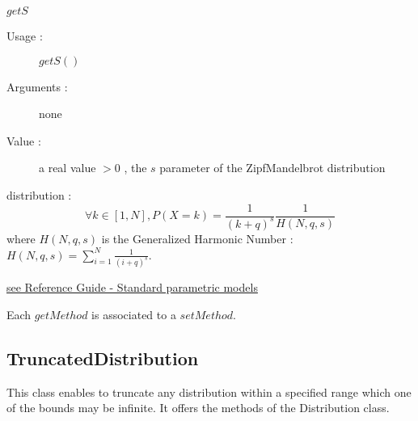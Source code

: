 \begin{description}
\begin{description}
  \item $getS$
    \begin{description}
    \item[Usage :] $getS()$
    \item[Arguments :] none
    \item[Value :]  a real value $>0$ ,  the $s$ parameter of the ZipfMandelbrot distribution
    \end{description}

  \end{description}

\item[Details :]  \rule{0pt}{1em}
  \begin{description}
  \item distribution :
    $$
    \forall k\in [1,N], P(X=k) = \frac{1}{(k+q)^s} \frac{1}{H(N,q,s)}
    $$
    where $H(N,q,s)$ is the Generalized Harmonic Number : $H(N,q,s) = \sum_{i=1}^{N} \displaystyle \frac{1}{(i+q)^s}$.

  \end{description}
  \bigskip

\item[Links :]  \rule{0pt}{1em}
  \href{OpenTURNS_ReferenceGuide.pdf}{see Reference Guide - Standard parametric models}
\end{description}


Each  $getMethod$  is associated to a $setMethod$.





\newpage \subsection{TruncatedDistribution}



This class enables to truncate any distribution within a specified range which one of the bounds may be infinite. It offers the methods of the Distribution class.

